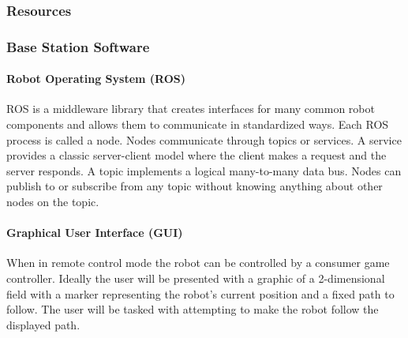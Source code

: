 \documentclass[english,12pt]{article}
\begin{document}
\subsubsection{Resources}
\subsubsection{Base Station Software}
\paragraph{Robot Operating System (ROS)}
ROS is a middleware library that creates interfaces for many common robot components and allows
them to communicate in standardized ways. Each ROS process is called a node. Nodes communicate
through topics or services. A service provides a classic server-client model where the client makes a
request and the server responds. A topic implements a logical many-to-many data bus. Nodes can
publish to or subscribe from any topic without knowing anything about other nodes on the topic.
\paragraph{Graphical User Interface (GUI)}
When in remote control mode the robot can be controlled by a consumer game controller. Ideally the
user will be presented with a graphic of a 2-dimensional field with a marker representing the robot’s 
current position and a fixed path to follow. The user will be tasked with attempting to make the robot
follow the displayed path.
\end{document}
